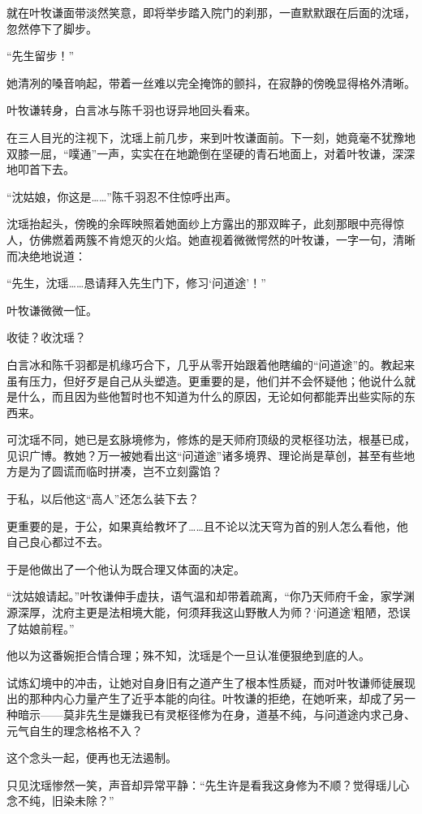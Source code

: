 就在叶牧谦面带淡然笑意，即将举步踏入院门的刹那，一直默默跟在后面的沈瑶，忽然停下了脚步。

“先生留步！”

她清冽的嗓音响起，带着一丝难以完全掩饰的颤抖，在寂静的傍晚显得格外清晰。

\vspace{2em}

叶牧谦转身，白言冰与陈千羽也讶异地回头看来。

在三人目光的注视下，沈瑶上前几步，来到叶牧谦面前。下一刻，她竟毫不犹豫地双膝一屈，“噗通”一声，实实在在地跪倒在坚硬的青石地面上，对着叶牧谦，深深地叩首下去。

“沈姑娘，你这是……”陈千羽忍不住惊呼出声。

沈瑶抬起头，傍晚的余晖映照着她面纱上方露出的那双眸子，此刻那眼中亮得惊人，仿佛燃着两簇不肯熄灭的火焰。她直视着微微愕然的叶牧谦，一字一句，清晰而决绝地说道：

“先生，沈瑶……恳请拜入先生门下，修习‘问道途’！”

叶牧谦微微一怔。

收徒？收沈瑶？

白言冰和陈千羽都是机缘巧合下，几乎从零开始跟着他瞎编的“问道途”的。教起来虽有压力，但好歹是自己从头塑造。更重要的是，他们并不会怀疑他；他说什么就是什么，而且因为些他暂时也不知道为什么的原因，无论如何都能弄出些实际的东西来。

可沈瑶不同，她已是玄脉境修为，修炼的是天师府顶级的灵枢径功法，根基已成，见识广博。教她？万一被她看出这“问道途”诸多境界、理论尚是草创，甚至有些地方是为了圆谎而临时拼凑，岂不立刻露馅？

于私，以后他这“高人”还怎么装下去？

更重要的是，于公，如果真给教坏了……且不论以沈天穹为首的别人怎么看他，他自己良心都过不去。

于是他做出了一个他认为既合理又体面的决定。

“沈姑娘请起。”叶牧谦伸手虚扶，语气温和却带着疏离，“你乃天师府千金，家学渊源深厚，沈府主更是法相境大能，何须拜我这山野散人为师？‘问道途’粗陋，恐误了姑娘前程。”

他以为这番婉拒合情合理；殊不知，沈瑶是个一旦认准便狠绝到底的人。

试炼幻境中的冲击，让她对自身旧有之道产生了根本性质疑，而对叶牧谦师徒展现出的那种内心力量产生了近乎本能的向往。叶牧谦的拒绝，在她听来，却成了另一种暗示——莫非先生是嫌我已有灵枢径修为在身，道基不纯，与问道途内求己身、元气自生的理念格格不入？

这个念头一起，便再也无法遏制。

只见沈瑶惨然一笑，声音却异常平静：“先生许是看我这身修为不顺？觉得瑶儿心念不纯，旧染未除？”

